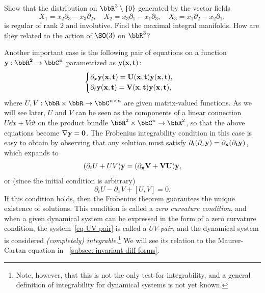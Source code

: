 \begin{xca}
    Show that the distribution on $\bbR^3\setminus \{0\}$ generated by the vector fields
    \[X_1=x_2\partial_3-x_3\partial_2,\quad X_2=x_3\partial_1-x_1\partial_3,\quad X_3=x_1\partial_2-x_2\partial_1,\]
    is regular of rank $2$ and involutive. Find the maximal integral manifolds. How are they related to the action of $\SO(3)$ on $\bbR^3$?
\end{xca}


\begin{example}\label{ex UV pairs}
    Another important case is the following pair of equations on a function $\bf{y}:\bbR^2\to \bbC^n$ parametrized as $\bf{y}(x,t)$:
    \[\begin{cases}
        \partial_x \bf{y}(x,t)= U(x,t)\bf{y}(x,t),\\
        \partial_t \bf{y}(x,t)= V(x,t)\bf{y}(x,t),
    \end{cases}\label{eq UV pair}\]
    where $U,V:\bbR\times\bbR\to \bbC^{n\times n}$ are given matrix-valued functions. As we will see later, $U$ and $V$ can be seen as the components of a linear connection $U\dd x+V\dd t$ on the product bundle $\bbR^2\times\bbC^n\to \bbR^2$, so that the above equations become $\nabla\bf{y}=0$. The Frobenius integrability condition in this case is easy to obtain by observing that any solution must satisfy $\partial_t(\partial_x \bf{y})=\partial_x(\partial_t \bf{y})$, which expands to 
    \[(\partial_t U+UV)\bf{y}=(\partial_x V+VU)\bf{y},\]
    or (since the initial condition is arbitrary)
    \[\partial_t U-\partial_x V+[U,V]=0.\]
    If this condition holds, then the Frobenius theorem guarantees the unique existence of solutions. This condition is called a \emph{zero curvature condition}, and when a given dynamical system can be expressed in the form of a zero curvature condition, the system~\eqref{eq UV pair} is called a \emph{$UV$-pair}, and the dynamical system is considered \emph{(completely) integrable}.\footnote{Note, however, that this is not the only test for integrability, and a general definition of integrability for dynamical systems is not yet known.} We will see its relation to the Maurer-Cartan equation in \sect\ \ref{subsec: invariant diff forms}.
\end{example}


